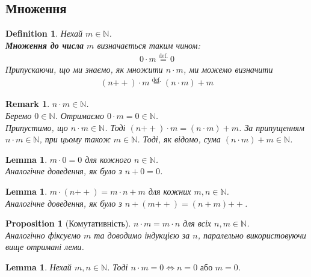 \documentclass[a4paper, 14pt]{extarticle}
\theoremstyle{theoremdd}
\theoremstyle{theoremdd}
\newtheorem{definition}[theorem]{Definition}
\theoremstyle{theoremdd}
\theoremstyle{theoremdd}
\theoremstyle{theoremdd}
\theoremstyle{theoremdd}
\theoremstyle{theoremdd}
\theoremstyle{theoremdd}
\theoremstyle{theoremdd}
\theoremstyle{theoremdd}
\newtheorem{proposition}[theorem]{Proposition}
\theoremstyle{theoremdd}
\theoremstyle{theoremdd}
\newtheorem{remark}[theorem]{Remark}
\theoremstyle{theoremdd}
\theoremstyle{theoremdd}
\newtheorem{lemma}[theorem]{Lemma}
\theoremstyle{theoremdd}
\theoremstyle{theoremdd}
\newcommand{\plusplus}{\!\!\mathrel{++}}
\begin{document}
\subsection{Множення}
\begin{definition}
Нехай $m \in \mathbb{N}$.\\
\textbf{Множення до числа} $m$ визначається таким чином:
\begin{align*}
0 \cdot m \overset{\text{def.}}{=} 0
\end{align*}
Припускаючи, що ми знаємо, як множити $n \cdot m$, ми можемо визначити
\begin{align*}
(n \plusplus) \cdot m \overset{\text{def.}}{=} (n \cdot m) + m
\end{align*}
\end{definition}

\begin{remark}
$n \cdot m \in \mathbb{N}$.\\
Беремо $0 \in \mathbb{N}$. Отримаємо $0 \cdot m = 0 \in \mathbb{N}$.\\
Припустимо, що $n \cdot m \in \mathbb{N}$. Тоді $(n \plusplus) \cdot m = (n \cdot m) + m$. За припущенням $n \cdot m \in \mathbb{N}$, при цьому також $m \in \mathbb{N}$. Тоді, як відомо, сума $(n \cdot m) + m \in \mathbb{N}$.  
\end{remark}

\begin{lemma}
$m \cdot 0 = 0$ для кожного $n \in \mathbb{N}$.\\
\textit{Аналогічне доведення, як було з $n + 0 = 0$.} 
\end{lemma}

\begin{lemma}
$m \cdot (n \plusplus) = m \cdot n + m$ для кожних $m,n \in \mathbb{N}$.\\
\textit{Аналогічне доведення, як було з $n + (m \plusplus) = (n+m)\plusplus$.}
\end{lemma}

\begin{proposition}[Комутативність]
$n \cdot m = m \cdot n$ для всіх $n,m \in \mathbb{N}$.\\
\textit{Аналогічно фіксуємо $m$ та доводимо індукцією за $n$, паралельно використовуючи вище отримані леми}.
\end{proposition}

\begin{lemma}
Нехай $m,n \in \mathbb{N}$. Тоді $n \cdot m = 0 \iff n = 0 \text{ або } m = 0$. 
\end{lemma}
\end{document}
